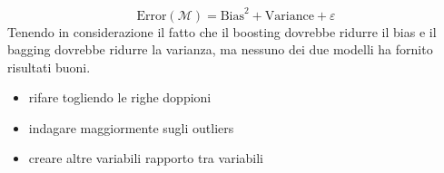 $$\text{Error}(\mathcal{M} ) = \text{Bias}^2 + \text{Variance} + \varepsilon$$
    Tenendo in considerazione il fatto che il boosting dovrebbe ridurre il bias e il bagging dovrebbe ridurre la varianza, ma nessuno dei due modelli ha fornito risultati buoni.

    \begin{itemize}
      \item rifare togliendo le righe doppioni
      \item indagare maggiormente sugli outliers
      \item creare altre variabili rapporto tra variabili
    \end{itemize}